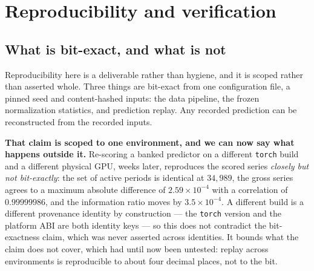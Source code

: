%
\section{Reproducibility and verification}
\label{sec:repro}

\subsection{What is bit-exact, and what is not}
\label{sec:repro-bitexact}

Reproducibility here is a deliverable rather than hygiene, and it is scoped rather than asserted
whole. Three things are bit-exact from one configuration file, a pinned seed and content-hashed
inputs: the data pipeline, the frozen normalization statistics, and prediction replay. Any recorded
prediction can be reconstructed from the recorded inputs.

\textbf{That claim is scoped to one environment, and we can now say what happens outside it.}
Re-scoring a banked predictor on a different \texttt{torch} build and a different physical GPU,
weeks later, reproduces the scored series \emph{closely but not bit-exactly}: the set of active
periods is identical at $34{,}989$, the gross series agrees to a maximum absolute difference of
$2.59\times10^{-4}$ with a correlation of $0.99999986$, and the information ratio moves by
$3.5\times10^{-4}$. A different build is a different provenance identity by construction --- the
\texttt{torch} version and the platform ABI are both identity keys --- so this does not contradict
the bit-exactness claim, which was never asserted across identities. It bounds what the claim does
not cover, which had until now been untested: replay across environments is reproducible to about
four decimal places, not to the bit.

